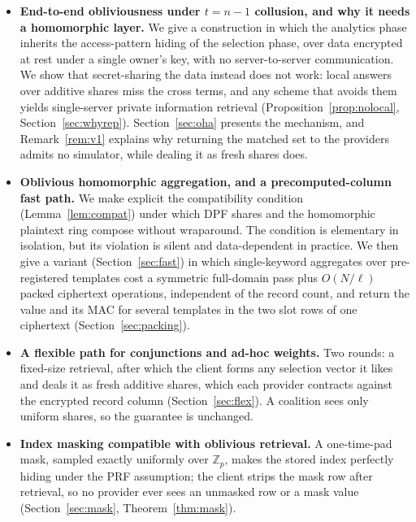 \documentclass[a4paper,fleqn]{cas-sc}
\begin{document}
\begin{itemize}
\item \textbf{End-to-end obliviousness under $t=n-1$ collusion, and why it
needs a homomorphic layer.} We give a construction in which the analytics
phase inherits the access-pattern hiding of the selection phase, over data
encrypted at rest under a single owner's key, with no server-to-server
communication. We show that secret-sharing the data instead does not work:
local answers over additive shares miss the cross terms, and any scheme that
avoids them yields single-server private information retrieval
(Proposition~\ref{prop:nolocal}, Section~\ref{sec:whyrep}).
Section~\ref{sec:oha} presents the mechanism, and Remark~\ref{rem:v1}
explains why returning the matched set to the providers admits no simulator,
while dealing it as fresh shares does.

\item \textbf{Oblivious homomorphic aggregation, and a precomputed-column fast
path.} We make explicit the compatibility condition (Lemma~\ref{lem:compat})
under which DPF shares and the homomorphic plaintext ring compose without
wraparound. The condition is elementary in isolation, but its violation is
silent and data-dependent in practice. We then give a variant
(Section~\ref{sec:fast}) in which single-keyword aggregates over pre-registered
templates cost a symmetric full-domain pass plus $O(N/\ell)$ packed ciphertext
operations, independent of the record count, and return the value and its MAC
for several templates in the two slot rows of one ciphertext
(Section~\ref{sec:packing}).

\item \textbf{A flexible path for conjunctions and ad-hoc weights.} Two rounds:
a fixed-size retrieval, after which the client forms any selection vector it
likes and deals it as fresh additive shares, which each provider contracts
against the encrypted record column (Section~\ref{sec:flex}). A coalition sees
only uniform shares, so the guarantee is unchanged.

\item \textbf{Index masking compatible with oblivious retrieval.} A
one-time-pad mask, sampled exactly uniformly over $\mathbb{Z}_p$, makes the
stored index perfectly hiding under the PRF assumption; the client strips the
mask row after retrieval, so no provider ever sees an unmasked row or a mask
value (Section~\ref{sec:mask}, Theorem~\ref{thm:mask}).


\end{itemize}
\end{document}
